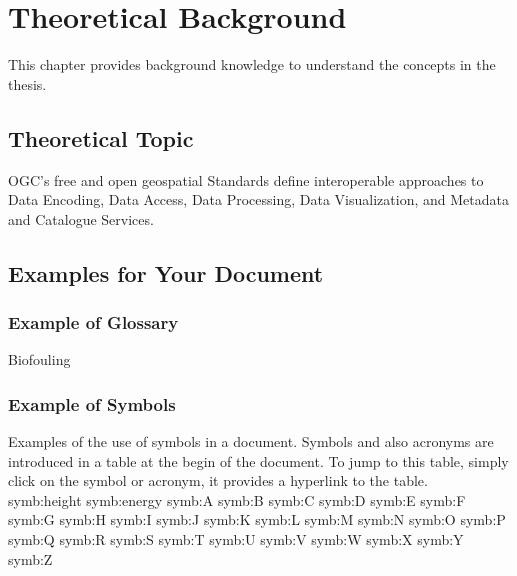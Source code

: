 \documentclass[class=scrbook, crop=false]{standalone}
\begin{document}
\ifstandalone

    
\fi

\chapter{Theoretical Background}
\label{Chapter::Theoretical_Background} %
This chapter provides background knowledge to understand the concepts in the thesis.

\section{Theoretical Topic}
\label{Section::Theoretical_Topic}
OGC’s free and open geospatial Standards define interoperable approaches to Data Encoding, Data Access, Data Processing,
Data Visualization, and Metadata and Catalogue Services. 

\section{Examples for Your Document}
    
    \subsection{Example of Glossary}
    \gls{Biofouling}
    
    \subsection{Example of Symbols}
    Examples of the use of symbols in a document. Symbols and also acronyms are introduced in a table at the begin of the document. To jump to this table, simply click on the symbol or acronym, it provides a hyperlink to the table.\\
    \gls{symb:height}
    \gls{symb:energy}
    \gls{symb:A}
    \gls{symb:B}
    \gls{symb:C}
    \gls{symb:D}
    \gls{symb:E}
    \gls{symb:F}
    \gls{symb:G}
    \gls{symb:H}
    \gls{symb:I}
    \gls{symb:J}
    \gls{symb:K}
    \gls{symb:L}
    \gls{symb:M}
    \gls{symb:N}
    \gls{symb:O}
    \gls{symb:P}
    \gls{symb:Q}
    \gls{symb:R}
    \gls{symb:S}
    \gls{symb:T}
    \gls{symb:U}
    \gls{symb:V}
    \gls{symb:W}
    \gls{symb:X}
    \gls{symb:Y}
    \gls{symb:Z}
    
\end{document}
